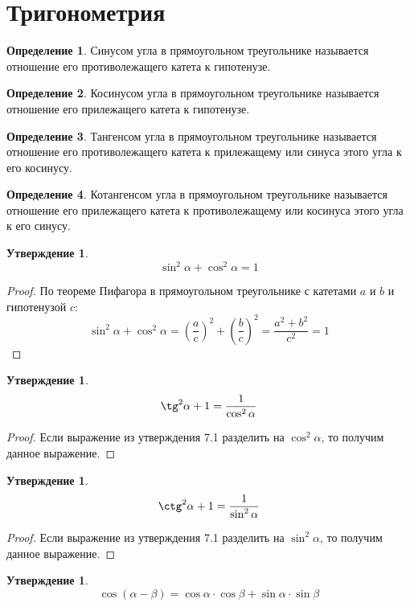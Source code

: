 \documentclass[12pt]{article}
\theoremstyle{definition}
\newtheorem{definition}{Определение}
\newtheorem{statement}[theorem]{Утверждение}
\begin{document}
\section{Тригонометрия}
\begin{definition}
    Синусом угла в прямоугольном треугольнике называется отношение его противолежащего катета к гипотенузе.
\end{definition}
\begin{definition}
    Косинусом угла в прямоугольном треугольнике называется отношение его прилежащего катета к гипотенузе.
\end{definition}
\begin{definition}
    Тангенсом угла в прямоугольном треугольнике называется отношение его противолежащего катета к прилежащему или синуса этого угла к его косинусу.
\end{definition}
\begin{definition}
    Котангенсом угла в прямоугольном треугольнике называется отношение его прилежащего катета к противолежащему или косинуса этого угла к его синусу.
\end{definition}
\begin{statement}
    $$\sin^2 \alpha + \cos^2 \alpha=1$$
\end{statement}
\begin{proof}
    По теореме Пифагора в прямоугольном треугольнике с катетами $a$ и $b$ и гипотенузой $c$:
    $$\sin^2 \alpha + \cos^2 \alpha=\left(\dfrac{a}{c}\right)^2+\left(\dfrac{b}{c}\right)^2=\dfrac{a^2 + b^2}{c^2}=1$$
\end{proof}
\begin{statement}
    $$\tg^2\alpha + 1=\dfrac{1}{\cos^2 \alpha}$$
\end{statement}
\begin{proof}
    Если выражение из утверждения 7.1 разделить на $\cos^2 \alpha$, то получим данное выражение.
\end{proof}
\begin{statement}
    $$\ctg^2\alpha + 1=\dfrac{1}{\sin^2 \alpha}$$
\end{statement}
\begin{proof}
    Если выражение из утверждения 7.1 разделить на $\sin^2 \alpha$, то получим данное выражение.
\end{proof}
\begin{statement}
    $$\cos(\alpha - \beta)=\cos\alpha\cdot\cos\beta+\sin\alpha\cdot\sin\beta$$
\end{statement}
\end{document}

